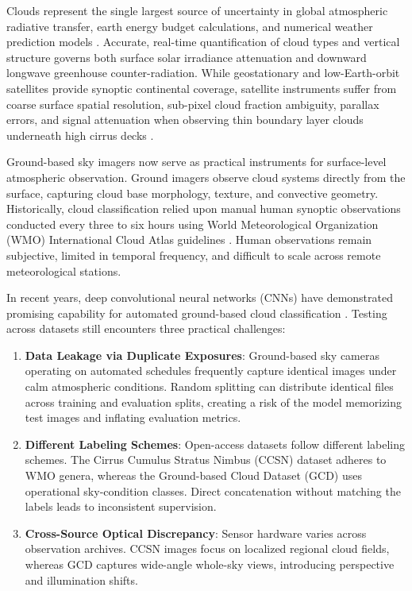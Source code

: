 \documentclass[11pt,a4paper]{article}
\begin{document}
Clouds represent the single largest source of uncertainty in global atmospheric radiative transfer, earth energy budget calculations, and numerical weather prediction models \cite{stephens2005cloud}. Accurate, real-time quantification of cloud types and vertical structure governs both surface solar irradiance attenuation and downward longwave greenhouse counter-radiation. While geostationary and low-Earth-orbit satellites provide synoptic continental coverage, satellite instruments suffer from coarse surface spatial resolution, sub-pixel cloud fraction ambiguity, parallax errors, and signal attenuation when observing thin boundary layer clouds underneath high cirrus decks \cite{heinle2010automatic}.

Ground-based sky imagers now serve as practical instruments for surface-level atmospheric observation. Ground imagers observe cloud systems directly from the surface, capturing cloud base morphology, texture, and convective geometry. Historically, cloud classification relied upon manual human synoptic observations conducted every three to six hours using World Meteorological Organization (WMO) International Cloud Atlas guidelines \cite{wmo2017cloud}. Human observations remain subjective, limited in temporal frequency, and difficult to scale across remote meteorological stations.

In recent years, deep convolutional neural networks (CNNs) have demonstrated promising capability for automated ground-based cloud classification \cite{zhang2018cloud, liu2022ground}. Testing across datasets still encounters three practical challenges:
\begin{enumerate}
    \item \textbf{Data Leakage via Duplicate Exposures}: Ground-based sky cameras operating on automated schedules frequently capture identical images under calm atmospheric conditions. Random splitting can distribute identical files across training and evaluation splits, creating a risk of the model memorizing test images and inflating evaluation metrics.
    \item \textbf{Different Labeling Schemes}: Open-access datasets follow different labeling schemes. The Cirrus Cumulus Stratus Nimbus (CCSN) dataset \cite{zhang2018cloud} adheres to WMO genera, whereas the Ground-based Cloud Dataset (GCD) \cite{liu2022ground} uses operational sky-condition classes. Direct concatenation without matching the labels leads to inconsistent supervision.
    \item \textbf{Cross-Source Optical Discrepancy}: Sensor hardware varies across observation archives. CCSN images focus on localized regional cloud fields, whereas GCD captures wide-angle whole-sky views, introducing perspective and illumination shifts.
\end{enumerate}
\end{document}
